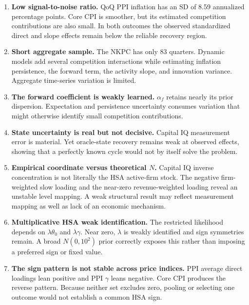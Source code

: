 \documentclass[11pt]{article}
\begin{document}
\begin{enumerate}
\item \textbf{Low signal-to-noise ratio.} QoQ PPI inflation has an SD of 8.59 annualized
percentage points. Core CPI is smoother, but its estimated competition contributions are
also small. In both outcomes the observed standardized direct and slope effects remain below
the reliable recovery region.

\item \textbf{Short aggregate sample.} The NKPC has only 83 quarters. Dynamic models add
several competition interactions while estimating inflation persistence, the forward term,
the activity slope, and innovation variance. Aggregate time-series variation is limited.

\item \textbf{The forward coefficient is weakly learned.} $\alpha_f$ retains nearly its prior
dispersion. Expectation and persistence uncertainty consumes variation that might otherwise
identify small competition contributions.

\item \textbf{State uncertainty is real but not decisive.} Capital IQ measurement error is
material. Yet oracle-state recovery remains weak at observed effects, showing that a perfectly
known cycle would not by itself solve the problem.

\item \textbf{Empirical coordinate versus theoretical $N$.} Capital IQ inverse concentration
is not literally the HSA active-firm stock. The negative firm-weighted slow loading and the
near-zero revenue-weighted loading reveal an unstable level mapping. A weak structural result
may reflect measurement mapping as well as lack of an economic mechanism.

\item \textbf{Multiplicative HSA weak identification.} The restricted likelihood depends on
$\lambda\theta_0$ and $\lambda\gamma$. Near zero, $\lambda$ is weakly identified and sign
symmetries remain. A broad $N(0,10^2)$ prior correctly exposes this rather than imposing a
preferred sign or fixed value.

\item \textbf{The sign pattern is not stable across price indices.} PPI average direct
loadings lean positive and PPI $\gamma$ leans negative. Core CPI produces the reverse pattern.
Because neither set excludes zero, pooling or selecting one outcome would not establish a
common HSA sign.


\end{enumerate}
\end{document}
